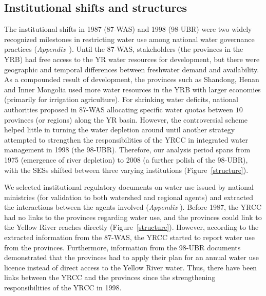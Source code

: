 
\subsection{Institutional shifts and structures}
\label{results-1}

The institutional shifts in 1987 (87-WAS) and 1998 (98-UBR) were two widely recognized milestones in restricting water use among national water governance practices (\textit{Appendix}~).
Until the 87-WAS, stakeholders (the provinces in the YRB) had free access to the YR water resources for development, but there were geographic and temporal differences between freshwater demand and availability.
As a compounded result of development, the provinces such as Shandong, Henan and Inner Mongolia used more water resources in the YRB with larger economies (primarily for irrigation agriculture).
For shrinking water deficits, national authorities proposed in 87-WAS allocating specific water quotas between $10$ provinces (or regions) along the YR basin.
However, the controversial scheme helped little in turning the water depletion around until another strategy attempted to strengthen the responsibilities of the YRCC in integrated water management in 1998 (the 98-UBR).
Therefore, our analysis period spans from 1975 (emergence of river depletion) to 2008 (a further polish of the 98-UBR), with the SESs shifted between three varying institutions (Figure~\ref{structure}).

We selected institutional regulatory documents on water use issued by national ministries (for validation to both watershed and regional agents) and extracted the interactions between the agents involved (\textit{Appendix }).
Before 1987, the YRCC had no links to the provinces regarding water use, and the provinces could link to the Yellow River reaches directly (Figure~\ref{structure}).
However, according to the extracted information from the 87-WAS, the YRCC started to report water use from the provinces.
Furthermore, information from the 98-UBR documents demonstrated that the provinces had to apply their plan for an annual water use licence instead of direct access to the Yellow River water.
Thus, there have been links between the YRCC and the provinces since the strengthening responsibilities of the YRCC in 1998.

